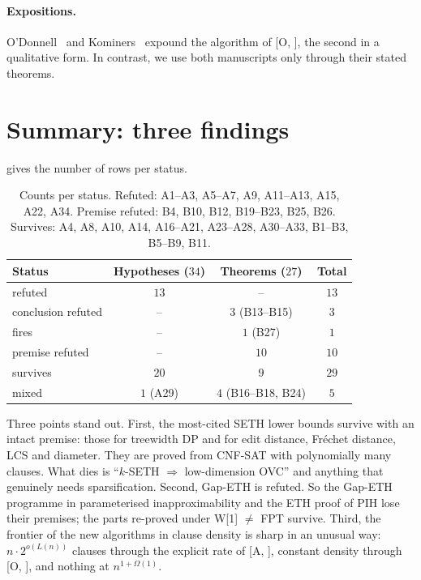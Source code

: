 \documentclass[10pt]{amsart}
\theoremstyle{plain}
\theoremstyle{definition}
\theoremstyle{remark}
\numberwithin{equation}{section}
\newcommand{\A}[1][]{\textup{[A\if\relax\detokenize{#1}\relax\else, #1\fi]}}
\newcommand{\Oa}[1][]{\textup{[O\if\relax\detokenize{#1}\relax\else, #1\fi]}}
\begin{document}
\paragraph{Expositions.} O'Donnell~\cite{ODo26} and Kominers~\cite{Kom26} expound the algorithm of
\Oa, the second in a qualitative form. In contrast, we use both manuscripts only through their
stated theorems.

\section{Summary: three findings}\label{sec:summary}

 gives the number of rows per status.

\begin{table}[h]
\centering\small
\begin{tabular}{@{}lccc@{}}
\toprule
Status & Hypotheses ($34$) & Theorems ($27$) & Total\\
\midrule
refuted & $13$ & -- & $13$\\
conclusion refuted & -- & $3$ (B13--B15) & $3$\\
fires & -- & $1$ (B27) & $1$\\
premise refuted & -- & $10$ & $10$\\
survives & $20$ & $9$ & $29$\\
mixed & $1$ (A29) & $4$ (B16--B18, B24) & $5$\\
\bottomrule
\end{tabular}
\caption{Counts per status. Refuted: A1--A3, A5--A7, A9, A11--A13, A15, A22, A34. Premise refuted:
B4, B10, B12, B19--B23, B25, B26. Survives: A4, A8, A10, A14, A16--A21, A23--A28, A30--A33, B1--B3,
B5--B9, B11.}\label{tab:counts}
\end{table}

Three points stand out. First, the most-cited SETH lower bounds survive with an intact premise:
those for treewidth DP and for edit distance, Fr\'echet distance, LCS and diameter. They are proved
from CNF-SAT with polynomially many clauses. What dies is ``$k$-SETH $\Rightarrow$ low-dimension
OVC'' and anything that genuinely needs sparsification. Second, Gap-ETH is refuted. So the Gap-ETH
programme in parameterised inapproximability and the ETH proof of PIH lose their premises; the parts
re-proved under W[1] $\ne$ FPT survive. Third, the frontier of the new algorithms in clause density
is sharp in an unusual way: $n\cdot2^{o(L(n))}$ clauses through the explicit rate of \A, constant
density through \Oa, and nothing at $n^{1+\Omega(1)}$.
\end{document}
